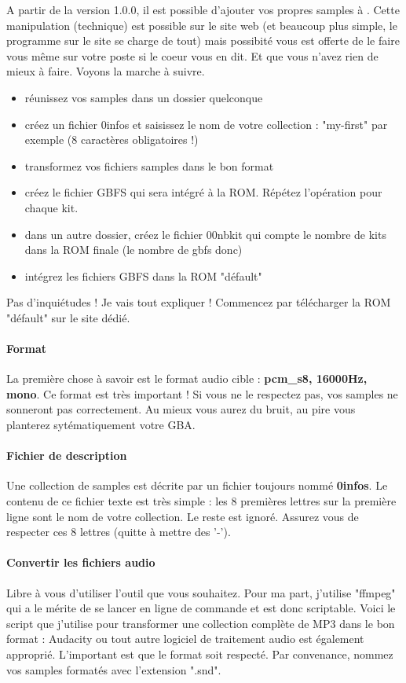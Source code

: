 \label{sec:addsamples}

A partir de la version 1.0.0, il est possible d'ajouter vos propres samples à \FAT.
Cette manipulation (technique) est possible sur le site web (et beaucoup plus simple, le programme sur le site se charge de tout)
mais possibité vous est offerte de le faire vous même sur votre poste si le coeur vous en dit. Et que vous n'avez rien de mieux à faire.
Voyons la marche à suivre.
\medskip

\begin{itemize}
  \item{réunissez vos samples dans un dossier quelconque}
  \item{créez un fichier 0infos et saisissez le nom de votre collection : "my-first" par exemple (8 caractères obligatoires !) }
  \item{transformez vos fichiers samples dans le bon format}
  \item{créez le fichier GBFS qui sera intégré à la ROM. Répétez l'opération pour chaque kit.}
  \item{dans un autre dossier, créez le fichier 00nbkit qui compte le nombre de kits dans la ROM finale (le nombre de gbfs donc)}
  \item{intégrez les fichiers GBFS dans la ROM "défault"}
\end{itemize}\medskip

Pas d'inquiétudes ! Je vais tout expliquer !
Commencez par télécharger la ROM "défault" sur le site dédié.

\paragraph{Format} La première chose à savoir est le format audio cible : {\bf pcm\_s8, 16000Hz, mono}.
Ce format est très important ! Si vous ne le respectez pas, vos samples ne sonneront pas correctement.
Au mieux vous aurez du bruit, au pire vous planterez sytématiquement votre GBA.

\paragraph{Fichier de description} Une collection de samples est décrite par un fichier toujours nommé {\bf 0infos}.
Le contenu de ce fichier texte est très simple : les 8 premières lettres sur la première ligne sont le nom de votre collection.
Le reste est ignoré. Assurez vous de respecter ces 8 lettres (quitte à mettre des '-').

\paragraph{Convertir les fichiers audio} Libre à vous d'utiliser l'outil que vous souhaitez.
Pour ma part, j'utilise "ffmpeg" qui a le mérite de se lancer en ligne de commande et est donc scriptable.
Voici le script que j'utilise pour transformer une collection complète de MP3 dans le bon format :
Audacity ou tout autre logiciel de traitement audio est également approprié.
L'important est que le format soit respecté.
Par convenance, nommez vos samples formatés avec l'extension ".snd".

